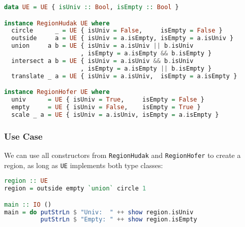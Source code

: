 \begin{lstlisting}[language=Haskell,deletekeywords={union,intersect}]
data UE = UE { isUniv :: Bool, isEmpty :: Bool }

instance RegionHudak UE where
  circle      _ = UE { isUniv = False,     isEmpty = False }
  outside     a = UE { isUniv = a.isEmpty, isEmpty = a.isUniv }
  union     a b = UE { isUniv = a.isUniv || b.isUniv
                     , isEmpty = a.isEmpty && b.isEmpty }
  intersect a b = UE { isUniv = a.isUniv && b.isUniv
                     , isEmpty = a.isEmpty || b.isEmpty }
  translate _ a = UE { isUniv = a.isUniv,  isEmpty = a.isEmpty }

instance RegionHofer UE where
  univ      = UE { isUniv = True,     isEmpty = False }
  empty     = UE { isUniv = False,    isEmpty = True }
  scale _ a = UE { isUniv = a.isUniv, isEmpty = a.isEmpty }
\end{lstlisting}

\subsubsection{Use Case}

We can use all constructors from \lstinline!RegionHudak!
and \lstinline!RegionHofer! to create a region, as long as
\lstinline!UE! implements both type classes:

\begin{lstlisting}[language=Haskell,deletekeywords={union,intersect}]
region :: UE
region = outside empty `union` circle 1

main :: IO ()
main = do putStrLn $ "Univ:  " ++ show region.isUniv
          putStrLn $ "Empty: " ++ show region.isEmpty
\end{lstlisting}
